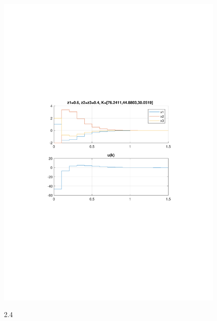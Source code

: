 \documentclass{article}
\begin{document}
{\begin{figure}[H]
\includegraphics[clip, trim=0.5cm 9.5cm 0.5cm 9.5cm, width=1.00\textwidth]{../rys/zad3b_rys4.pdf}
\label{fig:rys3.2.4}
\caption{2.4}
\end{figure}
}
\end{document}
